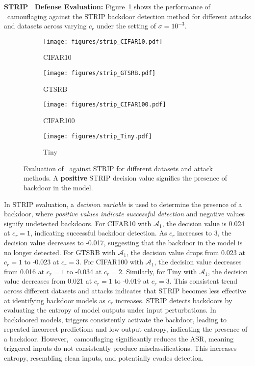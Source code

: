 \vspace{0.15cm}
\noindent \textbf{STRIP~\cite{strip} Defense Evaluation:} Figure~\ref{fig:strip} shows the performance of \methodname~camouflaging against the STRIP backdoor detection method for different attacks and datasets across varying $c_{r}$ under the setting of $\sigma = 10^{-3}$. 
\begin{figure}[!t]
    \centering
    \begin{subfigure}{0.48\linewidth}
        \centering
        \texttt{[image: figures/strip\_CIFAR10.pdf]}
        \caption{CIFAR10}
    \end{subfigure}\hspace{0.1cm}
    \begin{subfigure}{0.48\linewidth}
        \centering
        \texttt{[image: figures/strip\_GTSRB.pdf]}
        \caption{GTSRB}
    \end{subfigure}
    \begin{subfigure}{0.48\linewidth}
        \centering
        \texttt{[image: figures/strip\_CIFAR100.pdf]}
        \caption{CIFAR100}
    \end{subfigure}\hspace{0.1cm}
    \begin{subfigure}{0.48\linewidth}
        \centering
        \texttt{[image: figures/strip\_Tiny.pdf]}
        \caption{Tiny}
    \end{subfigure}
    \caption{Evaluation of \methodname~against STRIP for different datasets and attack methods. A \textbf{positive} STRIP decision value signifies the presence of backdoor in the model.}
    \label{fig:strip}
\end{figure}
In STRIP evaluation, a \textit{decision variable} is used to determine the presence of a backdoor, where \textit{positive values indicate successful detection} and negative values signify undetected backdoors. For CIFAR10 with $\mathcal{A}_1$, the decision value is 0.024 at $c_r = 1$, indicating successful backdoor detection. As $c_r$ increases to 3, the decision value decreases to -0.017, suggesting that the backdoor in the model is no longer detected. For GTSRB with $\mathcal{A}_1$, the decision value drops from 0.023 at $c_r = 1$ to -0.023 at $c_r = 3$. For CIFAR100 with $\mathcal{A}_1$, the decision value decreases from 0.016 at $c_r = 1$ to -0.034 at $c_r = 2$. Similarly, for Tiny with $\mathcal{A}_1$, the decision value decreases from 0.021 at $c_r = 1$ to -0.019 at $c_r = 3$. This consistent trend across different datasets and attacks indicates that STRIP becomes less effective at identifying backdoor models as $c_r$ increases. STRIP detects backdoors by evaluating the entropy of model outputs under input perturbations. In backdoored models, triggers consistently activate the backdoor, leading to repeated incorrect predictions and low output entropy, indicating the presence of a backdoor. However, \methodname~camouflaging significantly reduces the ASR, meaning triggered inputs do not consistently produce misclassifications. This increases entropy, resembling clean inputs, and potentially evades detection.

